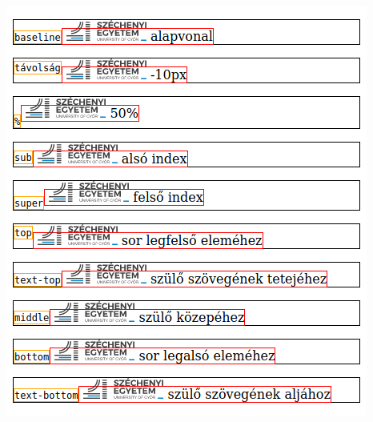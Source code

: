 \begin{frame}
  \begin{columns}[c]
      \begin{exampleblock}{}
        \tiny
        
        
      \end{exampleblock}
      \includegraphics[width=\textwidth]{fuggoleges.png}
  \end{columns}
\end{frame}

